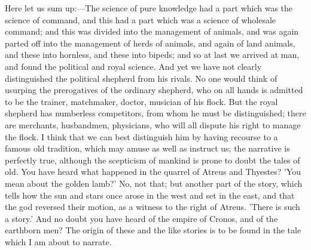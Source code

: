 \documentclass[11pt,letter]{article}
\begin{document}
\par  Here let us sum up:—The science of pure knowledge had a part which was the science of command, and this had a part which was a science of wholesale command; and this was divided into the management of animals, and was again parted off into the management of herds of animals, and again of land animals, and these into hornless, and these into bipeds; and so at last we arrived at man, and found the political and royal science. And yet we have not clearly distinguished the political shepherd from his rivals. No one would think of usurping the prerogatives of the ordinary shepherd, who on all hands is admitted to be the trainer, matchmaker, doctor, musician of his flock. But the royal shepherd has numberless competitors, from whom he must be distinguished; there are merchants, husbandmen, physicians, who will all dispute his right to manage the flock. I think that we can best distinguish him by having recourse to a famous old tradition, which may amuse as well as instruct us; the narrative is perfectly true, although the scepticism of mankind is prone to doubt the tales of old. You have heard what happened in the quarrel of Atreus and Thyestes? 'You mean about the golden lamb?' No, not that; but another part of the story, which tells how the sun and stars once arose in the west and set in the east, and that the god reversed their motion, as a witness to the right of Atreus. 'There is such a story.' And no doubt you have heard of the empire of Cronos, and of the earthborn men? The origin of these and the like stories is to be found in the tale which I am about to narrate.
\end{document}
